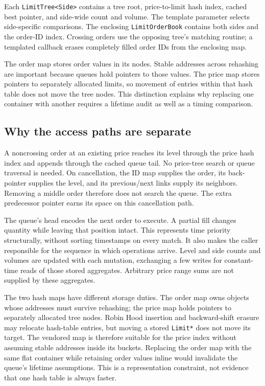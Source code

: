 \documentclass[10pt,letterpaper,twocolumn]{article}
\newcommand{\code}[1]{\texttt{#1}}
\begin{document}
Each \code{LimitTree<Side>} contains a tree root, price-to-limit hash index,
cached best pointer, and side-wide count and volume. The template parameter
selects side-specific comparisons. The enclosing \code{LimitOrderBook}
contains both sides and the order-ID index. Crossing orders use the opposing
tree's matching routine; a templated callback erases completely filled order
IDs from the enclosing map.

The order map stores order values in its nodes. Stable addresses across
rehashing are important because queues hold pointers to those values. The
price map stores pointers to separately allocated limits, so movement of
entries within that hash table does not move the tree nodes. This distinction
explains why replacing one container with another requires a lifetime audit
as well as a timing comparison.

\subsection{Why the access paths are separate}
A noncrossing order at an existing price reaches its level through the price
hash index and appends through the cached queue tail. No price-tree search or
queue traversal is needed. On cancellation, the ID map supplies the order,
its back-pointer supplies the level, and its previous/next links supply its
neighbors. Removing a middle order therefore does not search the queue.
The extra predecessor pointer earns its space on this cancellation path.

The queue's head encodes the next order to execute. A partial fill changes
quantity while leaving that position intact. This represents time priority
structurally, without sorting timestamps on every match. It also makes the
caller responsible for the sequence in which operations arrive. Level and
side counts and volumes are updated with each mutation, exchanging a few
writes for constant-time reads of those stored aggregates. Arbitrary price
range sums are not supplied by these aggregates.

The two hash maps have different storage duties. The order map owns objects
whose addresses must survive rehashing; the price map holds pointers to
separately allocated tree nodes. Robin Hood insertion and backward-shift
erasure may relocate hash-table entries, but moving a stored \code{Limit*}
does not move its target. The vendored map is therefore suitable for the
price index without assuming stable addresses inside its buckets. Replacing
the order map with the same flat container while retaining order values
inline would invalidate the queue's lifetime assumptions. This is a
representation constraint, not evidence that one hash table is always faster.
\end{document}
